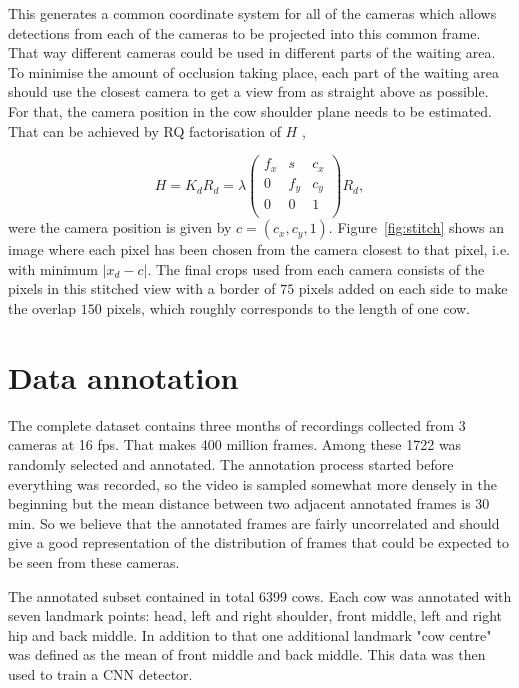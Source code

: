 \documentclass{IET}
\begin{document}
This generates a common coordinate system for all of the cameras which allows detections from each of the cameras to be projected into this common frame. That way different cameras could be used in different parts of the waiting area. To minimise the amount of occlusion taking place, each part of the waiting area should use the closest camera to get a view from as straight above as possible. For that, the camera position in the cow shoulder plane needs to be estimated. That can be achieved by RQ factorisation of $H$ \cite{Hartley2004}, 

\begin{equation}
H = K_d R_d = 
    \lambda
	\left(
	\begin{array}{ccc}
		f_x & s & c_x  \\
		0 & f_y & c_y  \\
		0 & 0 & 1  \\
	\end{array}
	\right)
	R_d ,
\end{equation}
were the camera position is given by $c = \left(c_x, c_y, 1\right)$. Figure~\ref{fig:stitch} shows an image where each pixel has been chosen from the camera closest to that pixel, i.e. with  minimum $\left| x_d - c \right|$. The final crops used from each camera consists of the pixels in this stitched view with a border of $75$ pixels added on each side to make the overlap $150$ pixels, which roughly corresponds to the length of one cow.


\section{Data annotation}

The complete dataset contains three months of recordings collected from 3 cameras at 16 fps. That makes 400 million frames. Among these 1722 was randomly selected and annotated. The annotation process started before everything was recorded, so the video is sampled somewhat more densely in the beginning but the mean distance between two adjacent annotated frames is 30 min. So we believe that the annotated frames are fairly uncorrelated and should give a good representation of the distribution of frames that could be expected to be seen from these cameras.

The annotated subset contained in total 6399 cows. Each cow was annotated with seven landmark points: head, left and right shoulder, front middle, left and right hip and back middle. In addition to that one additional landmark "cow centre" was defined as the mean of front middle and back middle. This data was then used to train a CNN detector.
\end{document}
